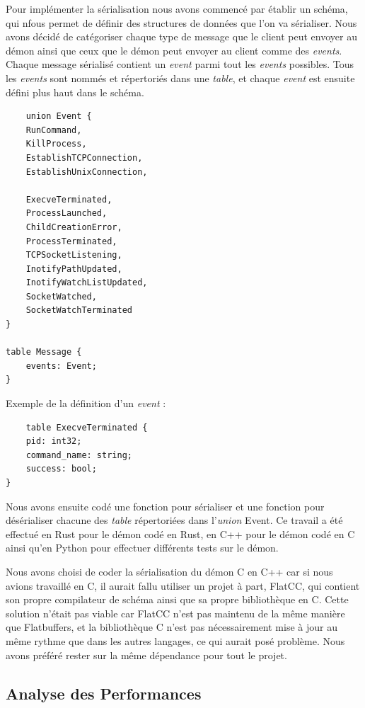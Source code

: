 \documentclass{article}
\begin{document}
Pour implémenter la sérialisation nous avons commencé par établir un schéma, qui nfous permet de définir des structures de données que l'on va sérialiser.
Nous avons décidé de catégoriser chaque type de message que le client peut envoyer au démon ainsi que ceux que le démon peut envoyer au client comme des \textit{events}. Chaque message sérialisé contient un \textit{event} parmi tout les \textit{events} possibles. Tous les \textit{events} sont nommés et répertoriés dans une \textit{table}, et chaque \textit{event} est ensuite défini plus haut dans le schéma.

\begin{verbatim}
    union Event {
    RunCommand,
    KillProcess,
    EstablishTCPConnection,
    EstablishUnixConnection,

    ExecveTerminated,
    ProcessLaunched,
    ChildCreationError,
    ProcessTerminated,
    TCPSocketListening,
    InotifyPathUpdated,
    InotifyWatchListUpdated,
    SocketWatched,
    SocketWatchTerminated
}

table Message {
    events: Event;
}
\end{verbatim}

\noindent Exemple de la définition d'un \textit{event} : 

\begin{verbatim}
    table ExecveTerminated {
    pid: int32;
    command_name: string;
    success: bool;
}
\end{verbatim}

Nous avons ensuite codé une fonction pour sérialiser et une fonction pour désérialiser chacune des \textit{table} répertoriées dans l'\textit{union} Event. Ce travail a été effectué en Rust pour le démon codé en Rust, en C++ pour le démon codé en C ainsi qu'en Python pour effectuer différents tests sur le démon. 

Nous avons choisi de coder la sérialisation du démon C en C++ car si nous avions travaillé en C, il aurait fallu utiliser un projet à part, FlatCC, qui contient son propre compilateur de schéma ainsi que sa propre bibliothèque en C. Cette solution n'était pas viable car FlatCC n'est pas maintenu de la même manière que Flatbuffers, et la bibliothèque C n'est pas nécessairement mise à jour au même rythme que dans les autres langages, ce qui aurait posé problème. Nous avons préféré rester sur la même dépendance pour tout le projet.

\subsection{Analyse des Performances}
\end{document}
